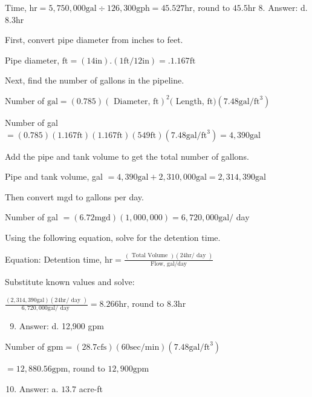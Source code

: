 \documentclass[10pt]{article}
\begin{document}
Time, $\mathrm{hr}=5,750,000 \mathrm{gal} \div 126,300 \mathrm{gph}=45.527 \mathrm{hr}$, round to $45.5 \mathrm{hr}$ 8. Answer: d. $8.3 \mathrm{hr}$

First, convert pipe diameter from inches to feet.

Pipe diameter, $\mathrm{ft}=(14 \mathrm{in}).(1 \mathrm{ft} / 12 \mathrm{in})=.1.167 \mathrm{ft}$

Next, find the number of gallons in the pipeline.

Number of $\mathrm{gal}=(0.785)(\text { Diameter, } \mathrm{ft})^{2}($ Length, $\mathrm{ft})\left(7.48 \mathrm{gal} / \mathrm{ft}^{3}\right)$

Number of gal $=(0.785)(1.167 \mathrm{ft})(1.167 \mathrm{ft})(549 \mathrm{ft})\left(7.48 \mathrm{gal} / \mathrm{ft}^{3}\right)=4,390 \mathrm{gal}$

Add the pipe and tank volume to get the total number of gallons.

Pipe and tank volume, gal $=4,390 \mathrm{gal}+2,310,000 \mathrm{gal}=2,314,390 \mathrm{gal}$

Then convert mgd to gallons per day.

Number of gal $=(6.72 \mathrm{mgd})(1,000,000)=6,720,000 \mathrm{gal} /$ day

Using the following equation, solve for the detention time.

Equation: Detention time, $\mathrm{hr}=\frac{(\text { Total Volume })(24 \mathrm{hr} / \text { day })}{\text { Flow, gal/day }}$

Substitute known values and solve:

$\frac{(2,314,390 \mathrm{gal})(24 \mathrm{hr} / \text { day })}{6,720,000 \mathrm{gal} / \text { day }}=8.266 \mathrm{hr}$, round to $8.3 \mathrm{hr}$

\begin{enumerate}
  \setcounter{enumi}{8}
  \item Answer: d. 12,900 gpm
\end{enumerate}

Number of $\mathrm{gpm}=(28.7 \mathrm{cfs})(60 \mathrm{sec} / \mathrm{min})\left(7.48 \mathrm{gal} / \mathrm{ft}^{3}\right)$

$=12,880.56 \mathrm{gpm}$, round to $12,900 \mathrm{gpm}$

\begin{enumerate}
  \setcounter{enumi}{9}
  \item Answer: a. $13.7$ acre-ft
\end{enumerate}
\end{document}
